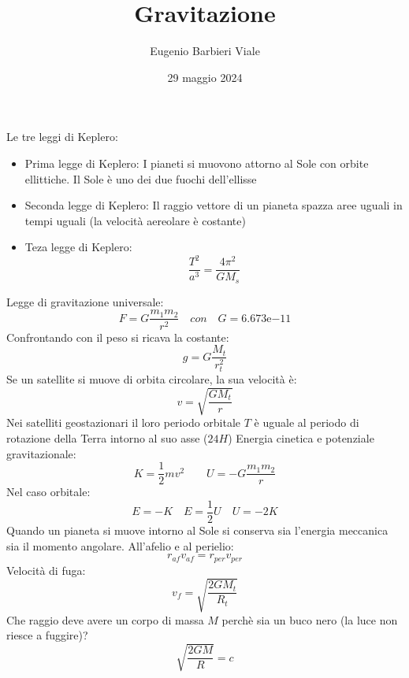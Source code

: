 \documentclass[]{article}
\title{Gravitazione}
\author{Eugenio Barbieri Viale}
\date{29 maggio 2024}
\begin{document}
\maketitle
Le tre leggi di Keplero:
\begin{itemize}
	\item Prima legge di Keplero: I pianeti si muovono attorno al Sole con orbite ellittiche. Il Sole è uno dei due fuochi dell'ellisse
	\item Seconda legge di Keplero: Il raggio vettore di un pianeta spazza aree uguali in tempi uguali (la velocità aereolare è costante)
	\item Teza legge di Keplero:
		$$\frac{T^2}{a^3}=\frac{4\pi^2}{GM_s}$$
\end{itemize}
Legge di gravitazione universale:
$$F = G\frac{m_1m_2}{r^2} \hspace{1em} con \hspace{1em} G=\mathrm{6.673e}{-11}$$
Confrontando con il peso si ricava la costante:
$$g=G\frac{M_t}{r_t^2}$$
Se un satellite si muove di orbita circolare, la sua velocità è:
$$v = \sqrt{\frac{GM_t}{r}}$$
Nei satelliti geostazionari il loro periodo orbitale $T$ è uguale al periodo di rotazione della Terra intorno al suo asse ($24H$)
Energia cinetica e potenziale gravitazionale:
$$K=\frac{1}{2}mv^2 \hspace{2em} U=-G\frac{m_1m_2}{r}$$
Nel caso orbitale:
$$E = -K \hspace{1em} E = \frac{1}{2}U \hspace{1em} U = -2K$$
Quando un pianeta si muove intorno al Sole si conserva sia l'energia meccanica sia il momento angolare. All'afelio e al perielio:
$$r_{af}v_{af} = r_{per}v_{per}$$
Velocità di fuga:
$$v_f = \sqrt{\frac{2GM_t}{R_t}}$$
Che raggio deve avere un corpo di massa $M$ perchè sia un buco nero (la luce non riesce a fuggire)?
$$\sqrt{\frac{2GM}{R}} = c$$
\end{document}
